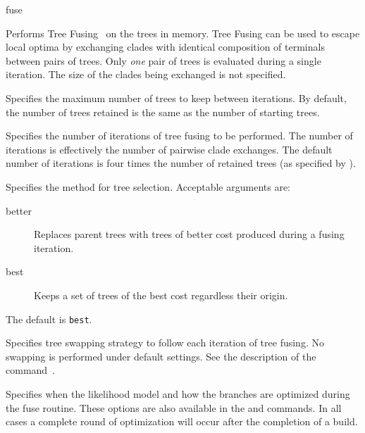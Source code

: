 \begin{command}{fuse}{}


    \begin{poydescription}
            Performs Tree Fusing~\cite{goloboff1999} on the trees in memory.  
            Tree Fusing  can be used to escape local optima
            by exchanging clades with identical composition of terminals between
            pairs of trees. Only \emph{one} pair of trees is evaluated during a single iteration.
            The size of the clades being exchanged is not specified.
    \end{poydescription}

    \begin{arguments}
            {Specifies the maximum number of trees to keep between iterations.
            By default, the number of trees retained is the same as the number
            of starting trees.}
            {}

            {Specifies the number of iterations of tree fusing to be performed. The
            number of iterations is effectively the number of pairwise clade exchanges. 
            The default number of iterations is four times the number of retained
            trees (as specified by ).}
            {}

            {Specifies the method for tree selection. Acceptable arguments
            are:
            \begin{description}
                \item[better] Replaces parent trees with trees of better cost
                produced during a fusing iteration.
                \item[best] Keeps a set of trees of the best cost regardless their origin.
            \end{description}
            The default is \texttt{best}.}
            {}

            {Specifies tree swapping strategy to follow each iteration of tree fusing.
            No swapping is performed under default settings.
            See the description of the command~.}
            {}

            {Specifies when the likelihood model and how the branches are
            optimized during the fuse routine. These options are also available
            in the  and  commands. In all
            cases a complete round of optimization will occur after the
            completion of a build.

}
\end{arguments}
\end{command}
